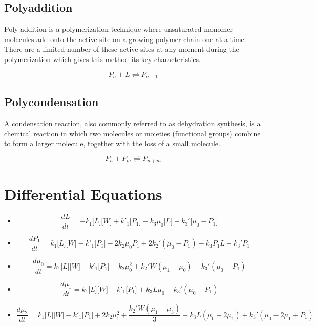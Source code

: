 \subsection*{Polyaddition}
Poly addition is a polymerization technique where unsaturated monomer molecules add onto the active site on a growing polymer chain one at a time. There are a limited number of these active sites at any moment during the polymerization which gives this method its key characteristics.
\newline
\begin{center}
 \[P_n + L \rightleftharpoons P_{n+1}\]
\end{center}
\subsection*{Polycondensation}


A condensation reaction, also commonly referred to as dehydration synthesis, is a chemical reaction in which two molecules or moieties (functional groups) combine to form a larger molecule, together with the loss of a small molecule.
\begin{center}
 \[P_n + P_m \rightleftharpoons P_{n+m}\]
\end{center}

\section*{Differential Equations}
\begin{itemize}
\item[] \[ \frac{dL}{dt} =-k_{1}  \big[L\big] \big[W\big] + k'_1 \big[P_1\big]  -k_3 \mu_0 \big[L\big]  + k_3' \big[\mu_0-P_1\big]   \]
\item[] \[ \frac{dP_1}{dt} =k_{1}  \big[L\big] \big[W\big] - k'_1 \big[P_1\big]  - 2k_2 \mu_0 P_1 + 2k_2'(\mu_0-P_1) -k_3 P_1 L +k_3'P_1 \]
\item[] \[ \frac{d\mu_0}{dt} = k_{1}  \big[L\big] \big[W\big] -k'_1 \big[P_1\big]  -k_2\mu_0^2+k_2'W(\mu_1-\mu_0) -k_3'(\mu_0-P_1)\]
\item[] \[ \frac{d\mu_1}{dt} = k_{1}  \big[L\big] \big[W\big] -k'_1 \big[P_1\big]  + k_3L\mu_0 -k_3'(\mu_0-P_1)\]
\item[] \[ \frac{d\mu_2}{dt} = k_{1}  \big[L\big] \big[W\big] -k'_1 \big[P_1\big]  + 2k_2 \mu_1^2 + \frac{k_2'W(\mu_1-\mu_3)}{3}+k_3L(\mu_0+2\mu_1)+k_3'(\mu_0-2\mu_1+P_1)\]
\end{itemize}




